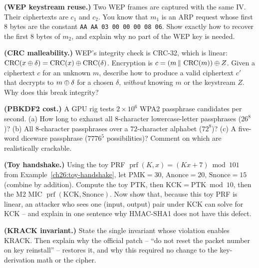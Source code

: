 \begin{exercise}
\textbf{(WEP keystream reuse.)} Two WEP frames are captured with the same IV. Their
ciphertexts are $c_1$ and $c_2$. You know that $m_1$ is an ARP request whose first
$8$ bytes are the constant \texttt{AA AA 03 00 00 00 08 06}. Show exactly how to
recover the first $8$ bytes of $m_2$, and explain why no part of the WEP key is
needed.
\end{exercise}

\begin{exercise}
\textbf{(CRC malleability.)} WEP's integrity check is CRC-32, which is linear:
$\operatorname{CRC}(x \oplus \delta) = \operatorname{CRC}(x) \oplus \operatorname{CRC}(\delta)$.
Encryption is $c = (m \,\|\, \operatorname{CRC}(m)) \oplus Z$. Given a ciphertext $c$ for
an unknown $m$, describe how to produce a valid ciphertext $c'$ that decrypts to
$m \oplus \delta$ for a chosen $\delta$, \emph{without} knowing $m$ or the keystream
$Z$. Why does this break integrity?
\end{exercise}

\begin{exercise}
\textbf{(PBKDF2 cost.)} A GPU rig tests $2 \times 10^{6}$ WPA2 passphrase
candidates per second. (a) How long to exhaust all $8$-character lowercase-letter
passphrases ($26^8$)? (b) All $8$-character passphrases over a $72$-character
alphabet ($72^8$)? (c) A five-word diceware passphrase ($7776^5$ possibilities)?
Comment on which are realistically crackable.
\end{exercise}

\begin{exercise}
\textbf{(Toy handshake.)} Using the toy PRF $\operatorname{prf}(K,x) = (Kx + 7) \bmod
101$ from Example~\ref{ch26:toy-handshake}, let $\text{PMK} = 30$, $\text{Anonce}
= 20$, $\text{Snonce} = 15$ (combine by addition). Compute the toy PTK, then
$\text{KCK} = \text{PTK} \bmod 10$, then the M2 MIC $\operatorname{prf}(\text{KCK},
\text{Snonce})$. Now show that, because this toy PRF is linear, an attacker who
sees one (input, output) pair under KCK can solve for KCK -- and explain in one
sentence why HMAC-SHA1 does not have this defect.
\end{exercise}

\begin{exercise}
\textbf{(KRACK invariant.)} State the single invariant whose violation enables
KRACK. Then explain why the official patch -- ``do not reset the packet number on
key reinstall'' -- restores it, and why this required no change to the key-
derivation math or the cipher.
\end{exercise}


